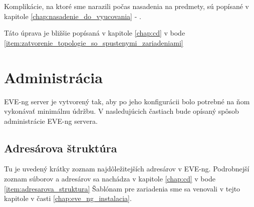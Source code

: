 Komplikácie, na ktoré sme narazili počas nasadenia na predmety, sú popísané v kapitole \ref{chap:nasadenie_do_vyucovania} - .

Táto úprava je bližšie popísaná v kapitole \ref{chap:cd} v bode \ref{item:zatvorenie_topologie_so_spustenymi_zariadeniami}






\section{Administrácia}

EVE-ng server je vytvorený tak, aby po jeho konfigurácii bolo potrebné na ňom vykonávať minimálnu údržbu. V nasledujúcich častiach bude opísaný spôsob administrácie EVE-ng servera.





\subsection{Adresárova štruktúra}
\label{chap:adresarova_struktura}

Tu je uvedený krátky zoznam najdôležitejších adresárov v EVE-ng. Podrobnejší zoznam súborov a adresárov sa nachádza v kapitole \ref{chap:cd} v bode \ref{item:adresarova_struktura} Šablónam pre zariadenia sme sa venovali v tejto kapitole v časti \ref{chap:eve_ng_instalacia}.





